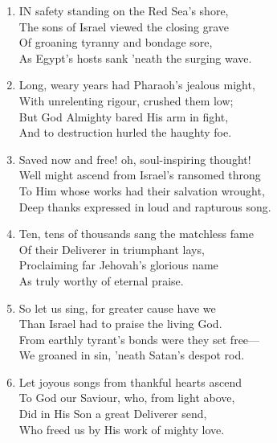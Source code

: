 \documentclass[11pt,a4paper]{article}
\begin{document}
\begin{enumerate}
    \item IN safety standing on the Red Sea's shore, \\
        The sons of Israel viewed the closing grave \\
        Of groaning tyranny and bondage sore, \\
        As Egypt's hosts sank 'neath the surging wave.

    \item Long, weary years had Pharaoh's jealous might, \\
        With unrelenting rigour, crushed them low; \\
        But God Almighty bared His arm in fight, \\
        And to destruction hurled the haughty foe.

    \item Saved now and free! oh, soul-inspiring thought! \\
        Well might ascend from Israel's ransomed throng \\
        To Him whose works had their salvation wrought, \\
        Deep thanks expressed in loud and rapturous song.

    \item Ten, tens of thousands sang the matchless fame \\
        Of their Deliverer in triumphant lays, \\
        Proclaiming far Jehovah's glorious name \\
        As truly worthy of eternal praise.

    \item So let us sing, for greater cause have we \\
        Than Israel had to praise the living God. \\
        From earthly tyrant's bonds were they set free--- \\
        We groaned in sin, 'neath Satan's despot rod.

    \item Let joyous songs from thankful hearts ascend \\
        To God our Saviour, who, from light above, \\
        Did in His Son a great Deliverer send, \\
        Who freed us by His work of mighty love.

\end{enumerate}
\end{document}
